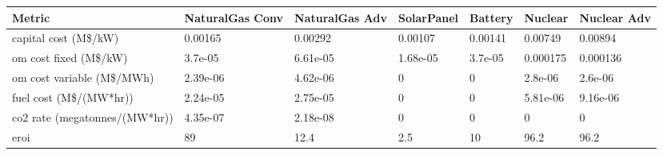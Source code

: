 \begin{tabular}{lllllll}
\toprule
Metric & NaturalGas Conv & NaturalGas Adv & SolarPanel & Battery & Nuclear & Nuclear Adv \\
\midrule
capital cost (M\$/kW) \cite{national_renewable_energy_laboratory_2023_2023}& 0.00165 & 0.00292 & 0.00107 & 0.00141 & 0.00749 & 0.00894 \\
om cost fixed (M\$/kW) \cite{national_renewable_energy_laboratory_2023_2023}& 3.7e-05 & 6.61e-05 & 1.68e-05 & 3.7e-05 & 0.000175 & 0.000136 \\
om cost variable (M\$/MWh) \cite{national_renewable_energy_laboratory_2023_2023}& 2.39e-06 & 4.62e-06 & 0 & 0 & 2.8e-06 & 2.6e-06 \\
fuel cost (M\$/(MW*hr))  \cite{national_renewable_energy_laboratory_2023_2023,desai_nuclear_2020}& 2.24e-05 & 2.75e-05 & 0 & 0 & 5.81e-06 & 9.16e-06 \\
co2 rate (megatonnes/(MW*hr)) \cite{energy_information_administration_how_2024}& 4.35e-07 & 2.18e-08 & 0 & 0 & 0 & 0 \\
eroi \cite{walmsley_energy_2018} & 89 & 12.4 & 2.5 & 10 & 96.2 & 96.2 \\
\bottomrule
\end{tabular}
